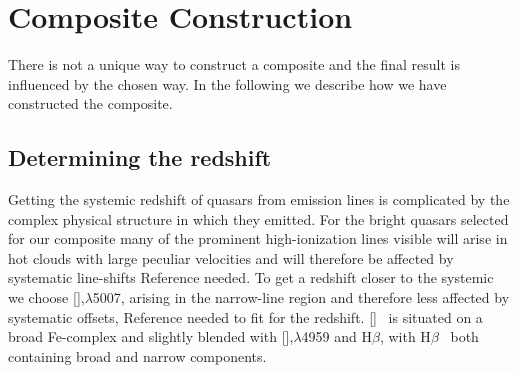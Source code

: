 \documentclass{aa}    %
\newcommand{\sectlabel}[1]{\label{sect:#1}}
\newcommand{\hb}{H$\beta$}
\newcommand{\oiii}{[\ion{O}{iii}]}
\begin{document}
\section{Composite Construction}   \sectlabel{construct}

There is not a unique way to construct a composite and the final result is influenced by the chosen way. In the following we describe how we have constructed the composite.

\subsection{Determining the redshift}  \sectlabel{redshifts}

Getting the systemic redshift of quasars from emission lines is complicated by the complex physical structure in which they emitted. For the bright quasars selected for our composite many of the prominent high-ionization lines visible will arise in hot clouds with large peculiar velocities and will therefore be affected by systematic line-shifts {\color{red} Reference needed}. To get a redshift closer to the systemic we choose \oiii,$\lambda$5007,  arising in the narrow-line region and therefore less affected by systematic offsets, {\color{red} Reference needed} to fit for the redshift. \oiii~ is situated on a broad Fe-complex and slightly blended with \oiii,$\lambda$4959 and \hb, with \hb~ both containing broad and narrow components. 
\end{document}
